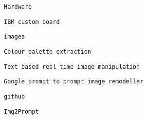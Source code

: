        
       
        \protect\hypertarget{ID_535165706}{}{}

\begin{verbatim}
Hardware
\end{verbatim}

         
         
          \protect\hypertarget{ID_1849101907}{}{}

\begin{verbatim}
IBM custom board
\end{verbatim}
         
       

       
       
        \protect\hypertarget{ID_784164284}{}{}

\begin{verbatim}
images
\end{verbatim}

         
         
          \protect\hypertarget{ID_713793979}{}{}

\begin{verbatim}
Colour palette extraction
\end{verbatim}
         

         
         
          \protect\hypertarget{ID_1520768843}{}{}

\begin{verbatim}
Text based real time image manipulation
\end{verbatim}
         

         
         
          \protect\hypertarget{ID_962207046}{}{}

\begin{verbatim}
Google prompt to prompt image remodeller
\end{verbatim}

           
           
            \protect\hypertarget{ID_1265419729}{}{}

\begin{verbatim}
github
\end{verbatim}
           
         

         
         
          \protect\hypertarget{ID_765292025}{}{}

\begin{verbatim}
Img2Prompt
\end{verbatim}
         

